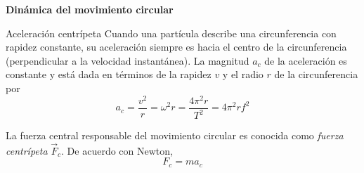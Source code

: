 \begin{frame}
    \begin{center}
        \Huge \textbf{Dinámica del movimiento circular}
    \end{center}
\end{frame}

\begin{frame}{Aceleración centrípeta}
    Cuando una partícula describe una circunferencia con rapidez constante, su aceleración siempre es hacia el centro de la circunferencia (perpendicular a la velocidad instantánea). La magnitud $a_c$ de la aceleración es constante y está dada en términos de la rapidez $v$ y el radio $r$ de la circunferencia por \begin{equation}
        a_c = \frac{v^2}{r}=\omega^2r=\frac{4\pi^2r}{T^2}=4\pi^2rf^2
    \end{equation}

    La fuerza central responsable del movimiento circular es conocida como \textit{fuerza centrípeta} $\vec{F}_c$. De acuerdo con Newton, \begin{equation}
        F_c = ma_c
    \end{equation}
\end{frame}

